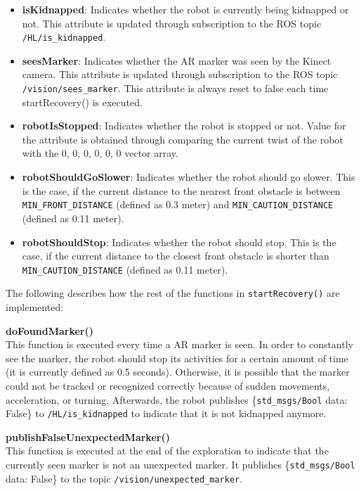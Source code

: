 \begin{itemize}
\item \textbf{isKidnapped}:
Indicates whether the robot is currently being kidnapped or not. This attribute is updated through subscription to the ROS topic \texttt{/HL/is\_kidnapped}.

\item \textbf{seesMarker}:
Indicates whether the AR marker was seen by the Kinect camera. This attribute is updated through subscription to the ROS topic \texttt{/vision/sees\_marker}. This attribute is always reset to false each time startRecovery() is executed.

\item \textbf{robotIsStopped}:
Indicates whether the robot is stopped or not. Value for the attribute is obtained through comparing the current twist of the robot with the {0, 0, 0, 0, 0, 0} vector array.

\item \textbf{robotShouldGoSlower}:
 Indicates whether the robot should go slower. This is the case, if the current distance to the nearest front obstacle is between \texttt{MIN\_FRONT\_DISTANCE} (defined as 0.3 meter) and \texttt{MIN\_CAUTION\_DISTANCE} (defined as 0.11 meter).

\item \textbf{robotShouldStop}:
Indicates whether the robot should stop. This is the case, if the current distance to the closest front obstacle is shorter than \texttt{MIN\_CAUTION\_DISTANCE}  (defined as 0.11 meter).
\end{itemize}


The following describes how the rest of the functions in \texttt{startRecovery()} are implemented:
\begin{description}

\item \textbf{doFoundMarker()} \hfill \\
This function is executed every time a AR marker is seen. In order to constantly see the marker, the robot should stop its activities for a certain amount of time (it is currently defined as 0.5 seconds). Otherwise, it is possible that the marker could not be tracked or recognized correctly because of sudden movements, acceleration, or turning. Afterwards, the robot publishes \{\texttt{std\_msgs/Bool} data: False\} to \texttt{/HL/is\_kidnapped} to indicate that it is not kidnapped anymore.

\item \textbf{publishFalseUnexpectedMarker()} \hfill \\
This function is executed at the end of the exploration to indicate that the currently seen marker is not an unexpected marker. It publishes \{\texttt{std\_msgs/Bool} data: False\} to the topic \texttt{/vision/unexpected\_marker}.

\end{description}

